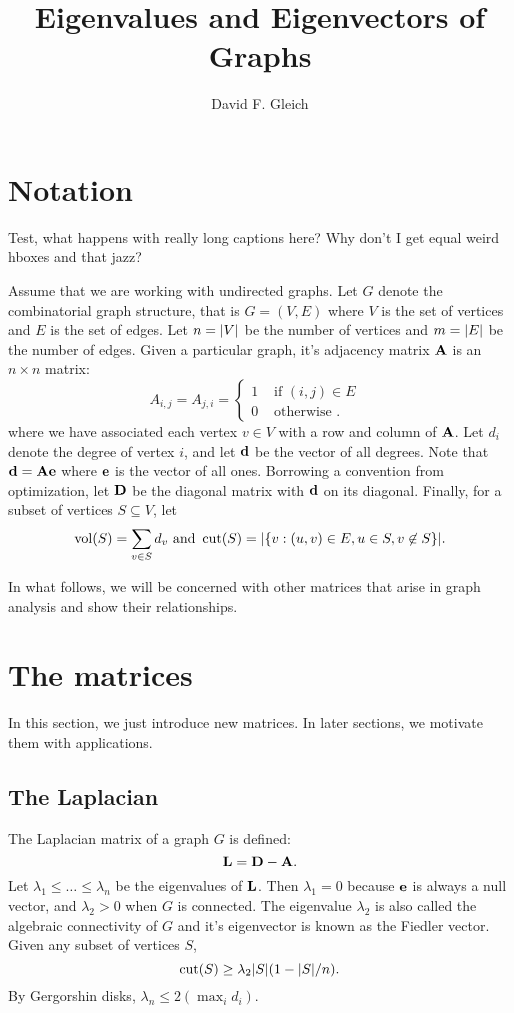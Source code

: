 \documentclass[nofonts]{dgleich-article}
\title{Eigenvalues and Eigenvectors of Graphs}
\author{David F. Gleich}
\DeclareMathOperator{\vol}{vol}
\DeclareMathOperator{\cut}{cut}
\begin{document}
\maketitle

\section{Notation}

\begin{marginfigure}
\caption{Test, what happens with really long captions here?  Why don't I get equal
weird hboxes and that jazz?} 
\end{marginfigure}


Assume that we are working with undirected graphs. Let $G$
denote the combinatorial graph structure, that is $G = (V,E)$ 
where $V$ is the set of vertices and $E$ is the set of edges.
Let $n = \lvert V\rvert$ be the number of vertices and $m = \lvert E\rvert$
be the number of edges. 
Given a particular graph, it's adjacency matrix $\boldsymbol{\mathrm{A}}$
is an $n \times n$ matrix:
\[ A_{i,j} = A_{j,i} = \begin{cases} 1 & \text{ if $(i,j) \in E$ } \\
                                     0 & \text{ otherwise }.
                       \end{cases}
\]
where we have associated each vertex $v \in V$ with a row and
column of $\boldsymbol{\mathrm{A}}$.  Let $d_i$ denote the degree of vertex $i$, and
let $\boldsymbol{\mathrm{d}}$ be the vector of all degrees.  Note that $\boldsymbol{\mathrm{d}} = \boldsymbol{\mathrm{A}} \boldsymbol{\mathrm{e}}$
where $\boldsymbol{\mathrm{e}}$ is the vector of all ones.  Borrowing a convention
from optimization, let $\boldsymbol{\mathrm{D}}$ be the diagonal matrix with $\boldsymbol{\mathrm{d}}$
on its diagonal.  Finally, for a subset of vertices $S \subseteq V$, let 
\[ \vol(S) = \sum_{v \in S} d_v \text{ and } 
    \cut(S) = \cardof*{ \BraceOf{ v : (u,v) \in E, u \in S, v \not\in S} }.
\]

In what follows, we will be concerned with other matrices that arise
in graph analysis and show their relationships.

\section{The matrices}

In this section, we just introduce new matrices.  In later sections, we motivate
them with applications.

\subsection{The Laplacian}
The Laplacian matrix of a graph $G$ is defined:
\[ \boldsymbol{\mathrm{L}} = \boldsymbol{\mathrm{D}} - \boldsymbol{\mathrm{A}}. \]
Let $\lambda_1 \le \ldots \le \lambda_n$ be the eigenvalues of $\boldsymbol{\mathrm{L}}$.
Then $\lambda_1 = 0$ because $\boldsymbol{\mathrm{e}}$ is always a null vector,
and $\lambda_2 > 0$ when $G$ is connected.  The eigenvalue $\lambda_2$
is also called the algebraic connectivity of $G$ and it's eigenvector
is known as the Fiedler vector.  Given any subset of vertices $S$, 
\[ \cut(S) \ge \lambda_2 \cardof{S} (1 - \cardof{S}/n). \]
By Gergorshin disks, $\lambda_n \le 2 (\max_i d_i).$
\end{document}
